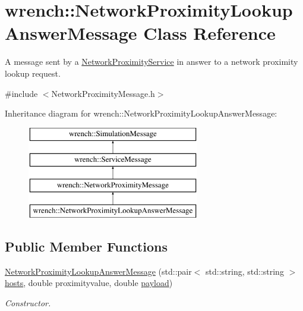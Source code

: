 \hypertarget{classwrench_1_1_network_proximity_lookup_answer_message}{}\section{wrench\+:\+:Network\+Proximity\+Lookup\+Answer\+Message Class Reference}
\label{classwrench_1_1_network_proximity_lookup_answer_message}


A message sent by a \hyperlink{classwrench_1_1_network_proximity_service}{Network\+Proximity\+Service} in answer to a network proximity lookup request.  




{\ttfamily \#include $<$Network\+Proximity\+Message.\+h$>$}

Inheritance diagram for wrench\+:\+:Network\+Proximity\+Lookup\+Answer\+Message\+:\begin{figure}[H]
\begin{center}
\leavevmode
\includegraphics[height=4.000000cm]{classwrench_1_1_network_proximity_lookup_answer_message}
\end{center}
\end{figure}
\subsection*{Public Member Functions}
\begin{DoxyCompactItemize}
\item 
\hyperlink{classwrench_1_1_network_proximity_lookup_answer_message_aff3f4b8a1c8675a9d42e0e5be7d287f1}{Network\+Proximity\+Lookup\+Answer\+Message} (std\+::pair$<$ std\+::string, std\+::string $>$ \hyperlink{classwrench_1_1_network_proximity_lookup_answer_message_a7a2f74767626046b35cc52a16ec97405}{hosts}, double proximityvalue, double \hyperlink{classwrench_1_1_simulation_message_a914f2732713f7c02898e66f05a7cb8a1}{payload})
\begin{DoxyCompactList}\small\item\em Constructor. \end{DoxyCompactList}\end{DoxyCompactItemize}
